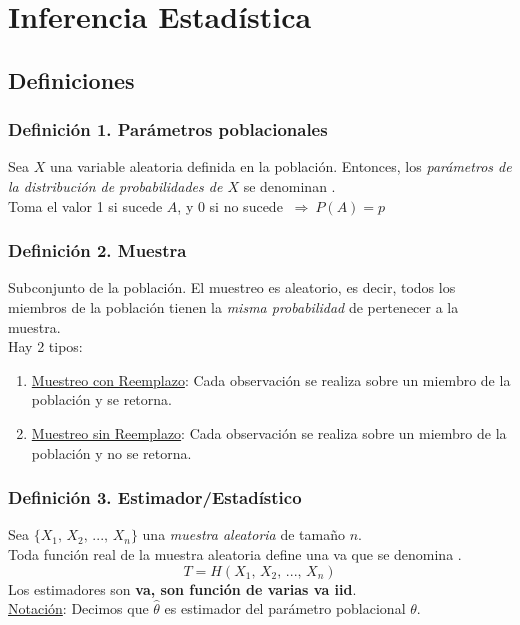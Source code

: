 \documentclass{article}
\newcommand{\comma}{,\,}                                %
\newcommand{\Rightarrows}{\: \Rightarrow \:}            %
\begin{document}
\newpage
\section{Inferencia Estadística}
\subsection{Definiciones}
\subsubsection*{Definición 1. Parámetros poblacionales}
Sea $X$ una variable aleatoria definida en la población. Entonces, los \emph{parámetros de la distribución de probabilidades de $X$} se denominan .
\\Toma el valor 1 si sucede $A$, y 0 si no sucede $\Rightarrows P(A) = p$

\subsubsection*{Definición 2. Muestra}
Subconjunto de la población. El muestreo es aleatorio, es decir, todos los miembros de la población tienen la \emph{misma probabilidad} de pertenecer a la muestra.
\\Hay 2 tipos:
\begin{enumerate}
    \item \underline{Muestreo con Reemplazo}: Cada observación se realiza sobre un miembro de la población y se retorna.
    \item \underline{Muestreo sin Reemplazo}: Cada observación se realiza sobre un miembro de la población y no se retorna.
\end{enumerate}

\subsubsection*{Definición 3. Estimador/Estadístico}
Sea $\{ X_1 \comma X_2 \comma ... \comma X_n \}$ una \emph{muestra aleatoria} de tamaño $n$.
\\Toda función real de la muestra aleatoria define una va que se denomina .
\begin{equation*}
    T = H(X_1 \comma X_2 \comma ... \comma X_n)
\end{equation*}
Los estimadores son \textbf{va, son función de varias va iid}.
\\\underline{Notación}: Decimos que $\hat{\theta}$ es estimador del parámetro poblacional $\theta$.
\end{document}

